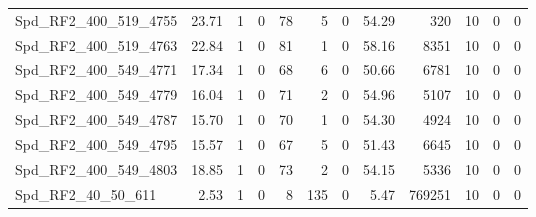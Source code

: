 \begin{longtable}[c]{@{}lrrrrrrrrrrr@{}}
Spd\_RF2\_400\_519\_4755     & 23.71                  & 1                       & 0                       & 78                     & 5                       & 0                       & 54.29                   & 320                      & 10                       & 0                        & 0                        \\
Spd\_RF2\_400\_519\_4763     & 22.84                  & 1                       & 0                       & 81                     & 1                       & 0                       & 58.16                   & 8351                     & 10                       & 0                        & 0                        \\
Spd\_RF2\_400\_549\_4771     & 17.34                  & 1                       & 0                       & 68                     & 6                       & 0                       & 50.66                   & 6781                     & 10                       & 0                        & 0                        \\
Spd\_RF2\_400\_549\_4779     & 16.04                  & 1                       & 0                       & 71                     & 2                       & 0                       & 54.96                   & 5107                     & 10                       & 0                        & 0                        \\
Spd\_RF2\_400\_549\_4787     & 15.70                  & 1                       & 0                       & 70                     & 1                       & 0                       & 54.30                   & 4924                     & 10                       & 0                        & 0                        \\
Spd\_RF2\_400\_549\_4795     & 15.57                  & 1                       & 0                       & 67                     & 5                       & 0                       & 51.43                   & 6645                     & 10                       & 0                        & 0                        \\
Spd\_RF2\_400\_549\_4803     & 18.85                  & 1                       & 0                       & 73                     & 2                       & 0                       & 54.15                   & 5336                     & 10                       & 0                        & 0                        \\
Spd\_RF2\_40\_50\_611        & 2.53                   & 1                       & 0                       & 8                      & 135                     & 0                       & 5.47                    & 769251                   & 10                       & 0                        & 0                        \\

\end{longtable}
